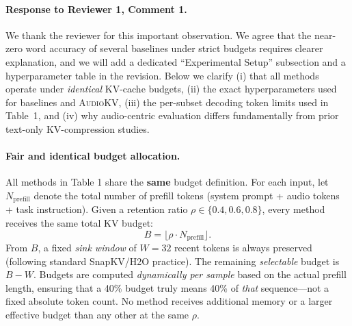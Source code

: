 \begin{answer}
    
    \paragraph{Response to Reviewer 1, Comment 1.}
    We thank the reviewer for this important observation.
    We agree that the near-zero word accuracy of several baselines under strict budgets requires clearer explanation, and we will add a dedicated ``Experimental Setup'' subsection and a hyperparameter table in the revision.
    Below we clarify (i) that all methods operate under \emph{identical} KV-cache budgets, (ii) the exact hyperparameters used for baselines and \textsc{AudioKV}, (iii) the per-subset decoding token limits used in Table~1, and (iv) why audio-centric evaluation differs fundamentally from prior text-only KV-compression studies.
    
    \paragraph{Fair and identical budget allocation.}
    All methods in Table 1 share the \textbf{same} budget definition.
    For each input, let $N_{\text{prefill}}$ denote the total number of prefill tokens (system prompt + audio tokens + task instruction).
    Given a retention ratio $\rho \in \{0.4, 0.6, 0.8\}$, every method receives the same total KV budget:
    \[
    B = \lfloor \rho \cdot N_{\text{prefill}} \rfloor .
    \]
    From $B$, a fixed \emph{sink window} of $W=32$ recent tokens is always preserved (following standard SnapKV/H2O practice).
    The remaining \emph{selectable} budget is $B - W$.
    Budgets are computed \emph{dynamically per sample} based on the actual prefill length, ensuring that a 40\% budget truly means 40\% of \emph{that} sequence---not a fixed absolute token count.
    No method receives additional memory or a larger effective budget than any other at the same $\rho$.
    

\end{answer}
